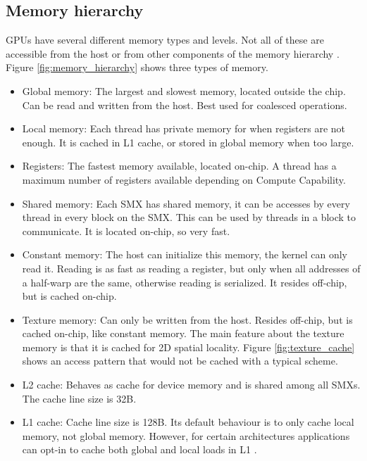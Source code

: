 \documentclass[../main/thesis.tex]{subfiles}
\begin{document}




\subsection{Memory hierarchy}
GPUs have several different memory types and levels.
Not all of these are accessible from the host or from other components of the memory hierarchy \cite{cuda}. Figure \ref{fig:memory_hierarchy} shows three types of memory.
\begin{itemize}
\item Global memory: The largest and slowest memory, located outside the chip. Can be read and written from the host. Best used for coalesced operations.
\item Local memory: Each thread has private memory for when registers are not enough. It is cached in L1 cache, or stored in global memory when too large.
\item Registers: The fastest memory available, located on-chip. A thread has a maximum number of registers available depending on Compute Capability.
\item Shared memory: Each SMX has shared memory, it can be accesses by every thread in every block on the SMX. This can be used by threads in a block to communicate. It is located on-chip, so very fast.
\item Constant memory: The host can initialize this memory, the kernel can only read it. Reading is as fast as reading a register, but only when all addresses of a half-warp are the same, otherwise reading is serialized. It resides off-chip, but is cached on-chip.
\item Texture memory: Can only be written from the host. Resides off-chip, but is cached on-chip, like constant memory. The main feature about the texture memory is that it is cached for 2D spatial locality. Figure \ref{fig:texture_cache} shows an access pattern that would not be cached with a typical scheme.
\item L2 cache: Behaves as cache for device memory and is shared among all SMXs. The cache line size is 32B.
\item L1 cache: Cache line size is 128B. Its default behaviour is to only cache local memory, not global memory. However, for certain architectures applications can opt-in to cache both global and local loads in L1 \cite{L1cache}.
\end{itemize}
\end{document}
